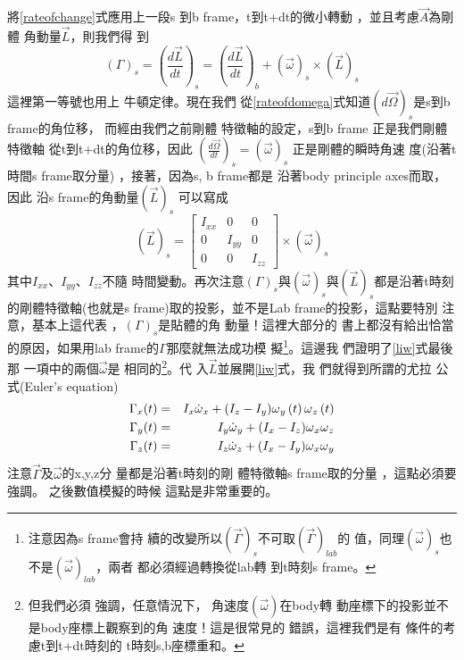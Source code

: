 \documentclass[12pt,twoside]{article}
\begin{document}
將\ref{rateofchange}式應用上一段s%
到b frame，t到t+dt的微小轉動%
，並且考慮$\vec{A}$為剛體%
角動量$\vec{L}$，則我們得%
到%
\begin{equation}
\left( \Gamma \right) _{s}=\left( \frac{d\vec{L}}{dt}\right) _{s}=\left( 
\frac{d\vec{L}}{dt}\right) _{b}+\left( \vec{\omega}\right) _{s}\times \left( 
\vec{L}\right) _{s}  \label{liw}
\end{equation}%
這裡第一等號也用上%
牛頓定律。現在我們%
從\ref{rateofdomega}式知道$\left( d\vec{\Omega}%
\right) _{s}$是s到b frame的角位移，%
而經由我們之前剛體%
特徵軸的設定，s到b frame%
正是我們剛體特徵軸%
從t到t+dt的角位移，因此%
$\left( \frac{d\vec{\Omega}}{dt}\right) _{s}=\left( \vec{\omega}\right) _{s}$%
正是剛體的瞬時角速%
度(沿著t時間s frame取分量)%
，接著，因為s, b frame都是%
沿著body principle axes而取，因此%
沿s frame的角動量$\left( \vec{L}\right) _{s}$%
可以寫成%
\begin{equation*}
\left( \vec{L}\right) _{s}=\left[ 
\begin{array}{ccc}
I_{xx} & 0 & 0 \\ 
0 & I_{yy} & 0 \\ 
0 & 0 & I_{zz}%
\end{array}%
\right] \times \left( \vec{\omega}\right) _{s}
\end{equation*}%
其中$I_{xx}$、$I_{yy}$、$I_{zz}$不隨%
時間變動。再次注意$%
\left( \Gamma \right) _{s}$與$\left( \vec{\omega}\right) _{s}$與$%
\left( \vec{L}\right) _{s}$都是沿著t時刻%
的剛體特徵軸(也就是s
frame)取的投影，並不是Lab
frame的投影，這點要特別%
注意，基本上這代表%
，$\left( \Gamma \right) _{s}$是貼體的角%
動量！這裡大部分的%
書上都沒有給出恰當%
的原因，如果用lab frame的$%
\Gamma $那麼就無法成功模%
擬\footnote{注意因為s frame會持%
續的改變所以$\left( \vec{\Gamma}\right)
_{s}$不可取$\left( \vec{\Gamma}\right) _{lab}$的%
值，同理$\left( \vec{\omega}\right) _{s}$也%
不是$\left( \vec{\omega}\right) _{lab}$，兩者%
都必須經過轉換從lab轉%
到t時刻s frame。}。這邊我%
們證明了\ref{liw}式最後那%
一項中的兩個$\vec{\omega}$是%
相同的\footnote{但我們必須%
強調，任意情況下，%
角速度$\left( \vec{\omega}\right) $在body轉%
動座標下的投影並不%
是body座標上觀察到的角%
速度！這是很常見的%
錯誤，這裡我們是有%
條件的考慮t到t+dt時刻的%
t時刻s,b座標重和。}。代%
入$\vec{L}$並展開\ref{liw}式，我%
們就得到所謂的尤拉%
公式(Euler's equation)%
\begin{eqnarray}
\Gamma _{x}(t) &=&I_{x}\dot{\omega}_{x}+(I_{z}-I_{y})\omega _{y}\left(
t\right) \omega _{z}\left( t\right)   \notag \\
\Gamma _{y}(t) &=&I_{y}\dot{\omega}_{y}+(I_{x}-I_{z})\omega _{x}\omega _{z}
\label{eulereqbody} \\
\Gamma _{z}(t) &=&I_{z}\dot{\omega}_{z}+(I_{x}-I_{y})\omega _{x}\omega _{y} 
\notag
\end{eqnarray}%
注意$\vec{\Gamma}$及$\vec{\omega}$的x,y,z分%
量都是沿著t時刻的剛%
體特徵軸s frame取的分量%
，這點必須要強調。%
之後數值模擬的時候%
這點是非常重要的。
\end{document}
